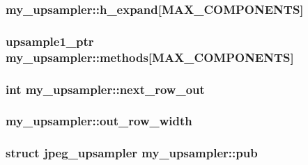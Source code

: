 \subsubsection[{h\+\_\+expand}]{ my\+\_\+upsampler\+::h\+\_\+expand\mbox{[}{\bf M\+A\+X\+\_\+\+C\+O\+M\+P\+O\+N\+E\+N\+T\+S}\mbox{]}}\label{structmy__upsampler_a4a82028e54b1f7e57b2c1f7d63290f65}
\hypertarget{structmy__upsampler_a3f1f669c2871ccaee6009ec6f96899d3}{}
\subsubsection[{methods}]{\setlength{\rightskip}{0pt plus 5cm}upsample1\+\_\+ptr my\+\_\+upsampler\+::methods\mbox{[}{\bf M\+A\+X\+\_\+\+C\+O\+M\+P\+O\+N\+E\+N\+T\+S}\mbox{]}}\label{structmy__upsampler_a3f1f669c2871ccaee6009ec6f96899d3}
\hypertarget{structmy__upsampler_a9e77765267bd21be6cb005b748034d76}{}
\subsubsection[{next\+\_\+row\+\_\+out}]{\setlength{\rightskip}{0pt plus 5cm}int my\+\_\+upsampler\+::next\+\_\+row\+\_\+out}\label{structmy__upsampler_a9e77765267bd21be6cb005b748034d76}
\hypertarget{structmy__upsampler_a315364082734b3779abccc258a2954e8}{}
\subsubsection[{out\+\_\+row\+\_\+width}]{ my\+\_\+upsampler\+::out\+\_\+row\+\_\+width}\label{structmy__upsampler_a315364082734b3779abccc258a2954e8}
\hypertarget{structmy__upsampler_a34dcee6f85a807bcacec127661432823}{}
\subsubsection[{pub}]{\setlength{\rightskip}{0pt plus 5cm}struct {\bf jpeg\+\_\+upsampler} my\+\_\+upsampler\+::pub}\label{structmy__upsampler_a34dcee6f85a807bcacec127661432823}
\hypertarget{structmy__upsampler_a05806e1394a2638e4912da137b9d4bcd}{}
